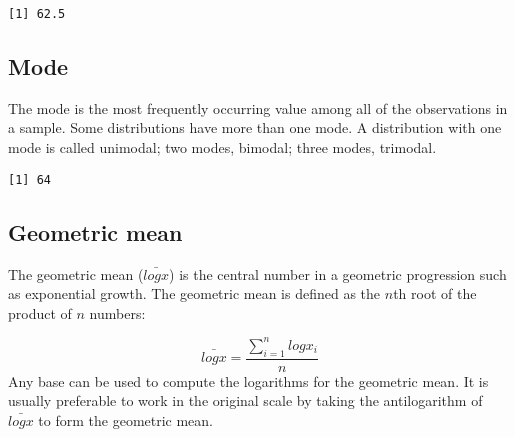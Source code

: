 \documentclass[]{book}
\newenvironment{Shaded}{\begin{snugshade}}{\end{snugshade}}
\newcommand{\KeywordTok}[1]{\textcolor[rgb]{0.13,0.29,0.53}{\textbf{#1}}}
\newcommand{\CommentTok}[1]{\textcolor[rgb]{0.56,0.35,0.01}{\textit{#1}}}
\newcommand{\OperatorTok}[1]{\textcolor[rgb]{0.81,0.36,0.00}{\textbf{#1}}}
\newcommand{\NormalTok}[1]{#1}
\theoremstyle{definition}
\theoremstyle{definition}
\theoremstyle{definition}
\theoremstyle{remark}
\begin{document}
\begin{Shaded}
\end{Shaded}

\begin{verbatim}
[1] 62.5
\end{verbatim}

\subsection{Mode}\label{mode}

The mode is the most frequently occurring value among all of the
observations in a sample. Some distributions have more than one mode. A
distribution with one mode is called unimodal; two modes, bimodal; three
modes, trimodal.

\begin{Shaded}
\end{Shaded}

\begin{verbatim}
[1] 64
\end{verbatim}

\subsection{Geometric mean}\label{geometric-mean}

The geometric mean (\(\bar{logx}\)) is the central number in a geometric
progression such as exponential growth. The geometric mean is defined as
the \({n}\)th root of the product of \({n}\) numbers:

\[\bar{logx}=\frac{\sum_{i=1}^nlogx_{i}}{n}\] Any base can be used to
compute the logarithms for the geometric mean. It is usually preferable
to work in the original scale by taking the antilogarithm of
\(\bar{logx}\) to form the geometric mean.

\begin{Shaded}
\end{Shaded}
\end{document}
